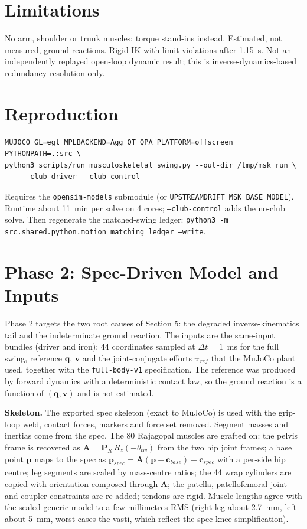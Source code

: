 \documentclass[11pt,a4paper]{article}
\begin{document}
\section{Limitations}
No arm, shoulder or trunk muscles; torque stand-ins instead. Estimated, not measured, ground reactions. Rigid IK with limit violations after 1.15~s. Not an independently replayed open-loop dynamic result; this is inverse-dynamics-based redundancy resolution only.

\section{Reproduction}
\begin{verbatim}
MUJOCO_GL=egl MPLBACKEND=Agg QT_QPA_PLATFORM=offscreen PYTHONPATH=.:src \
python3 scripts/run_musculoskeletal_swing.py --out-dir /tmp/msk_run \
    --club driver --club-control
\end{verbatim}
Requires the \texttt{opensim-models} submodule (or \texttt{UPSTREAMDRIFT\_MSK\_BASE\_MODEL}). Runtime about 11~min per solve on 4 cores; \texttt{--club-control} adds the no-club solve. Then regenerate the matched-swing ledger: \texttt{python3 -m src.shared.python.motion\_matching ledger --write}.

\section{Phase 2: Spec-Driven Model and Inputs}
Phase 2 targets the two root causes of Section 5: the degraded inverse-kinematics tail and the indeterminate ground reaction. The inputs are the same-input bundles (driver and iron): 44 coordinates sampled at $\Delta t=1$~ms for the full swing, reference $\mathbf{q}$, $\mathbf{v}$ and the joint-conjugate efforts $\boldsymbol\tau_{ref}$ that the MuJoCo plant used, together with the \texttt{full-body-v1} specification. The reference was produced by forward dynamics with a deterministic contact law, so the ground reaction is a function of $(\mathbf{q},\mathbf{v})$ and is not estimated.

\textbf{Skeleton.} The exported spec skeleton (exact to MuJoCo) is used with the grip-loop weld, contact forces, markers and force set removed. Segment masses and inertias come from the spec. The 80 Rajagopal muscles are grafted on: the pelvis frame is recovered as $\mathbf{A}=\mathbf{P}_R\,R_z(-\theta_{tw})$ from the two hip joint frames; a base point $\mathbf{p}$ maps to the spec as $\mathbf{p}_{spec}=\mathbf{A}(\mathbf{p}-\mathbf{c}_{base})+\mathbf{c}_{spec}$ with a per-side hip centre; leg segments are scaled by mass-centre ratios; the 44 wrap cylinders are copied with orientation composed through $\mathbf{A}$; the patella, patellofemoral joint and coupler constraints are re-added; tendons are rigid. Muscle lengths agree with the scaled generic model to a few millimetres RMS (right leg about 2.7~mm, left about 5~mm, worst cases the vasti, which reflect the spec knee simplification).
\end{document}
